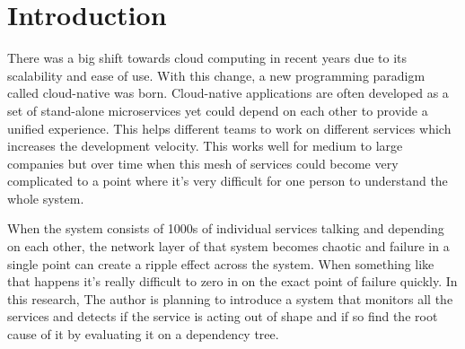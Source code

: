 \section{Introduction}

There was a big shift towards cloud computing in recent years due to its scalability and  ease of use. With this change, a new programming paradigm called cloud-native was born. Cloud-native applications are often developed as a set of stand-alone microservices \citep{dragoni2017microservices} yet could depend on each other to provide a unified experience. This helps different teams to work on different services which increases the development velocity. This works well for medium to large companies but over time when this mesh of services could become very complicated to a point where it's very difficult for one person to understand the whole system.

When the system consists of 1000s of individual services talking and depending on each other, the network layer of that system becomes chaotic \citep{Introduc54:online} and failure in a single point can create a ripple effect across the system. When something like that happens it's really difficult to zero in on the exact point of failure quickly. In this research, The author is planning to introduce a system that monitors all the services and detects if the service is acting out of shape and if so find the root cause of it by evaluating it on a dependency tree.